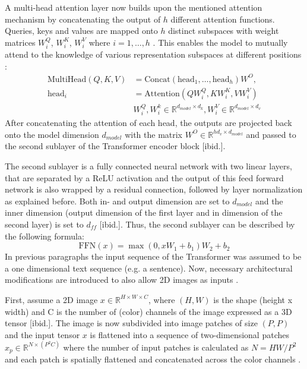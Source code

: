 A multi-head attention layer now builds upon the mentioned attention mechanism by concatenating the output of $h$ different attention functions.
Queries, keys and values are mapped onto $h$ distinct subspaces with weight matrices $W_i^Q$, $W_i^K$, $W_i^V$ where $i=1,\dots,h$ \citep{Vaswani2017}.
This enables the model to mutually attend to the knowledge of various representation subspaces at different positions \citep{Vaswani2017}:
\begin{align}
	\text{MultiHead}(Q,K,V) &= \text{Concat}(\text{head}_1,\dots,\text{head}_h)W^O, \\
	\text{head}_i & = \text{Attention}(QW_i^Q,KW_i^K,VW_i^V) \\
	& W_{i}^{Q}, W_{i}^{k} \in \mathbb{R}^{d_{model}\times d_k} , W_i^V \in \mathbb{R}^{d_{model} \times d_v}	
\end{align}
After concatenating the attention of each head, the outputs are projected back onto the model dimension $d_{model}$ with the matrix $W^O \in \mathbb{R}^{hd_v \times d_{model}}$ and passed to the second sublayer of the Transformer encoder block [ibid.].
\par
The second sublayer is a fully connected neural network with two linear layers, that are separated by a ReLU activation \citep{Vaswani2017} and the output of this feed forward network is also wrapped by a residual connection, followed by layer normalization as explained before.
Both in- and output dimension are set to $d_{model}$ and the inner dimension (output dimension of the first layer and in dimension of the second layer) is set to $d_{ff}$ [ibid.].
Thus, the second sublayer can be described by the following formula:
\begin{equation}
	\text{FFN}(x) = \max(0, xW_1 + b_1)W_2+b_2 
	\label{equation:FFN}
\end{equation}
In previous paragraphs the input sequence of the Transformer was assumed to be a one dimensional text sequence (e.g. a sentence).
Now, necessary architectural modifications are introduced to also allow 2D images as inputs \citep{Dosovitskiy2020}.
\par
First, assume a 2D image $x\in \mathbb{R}^{H\times W \times C }$, where $(H, W)$ is the shape (height x width) and C is the number of (color) channels of the image expressed as a 3D tensor [ibid.].
The image is now subdivided into image patches of size $(P, P)$ and the input tensor $x$ is flattened into a sequence of two-dimensional patches $x_p \in \mathbb{R}^{N \times (P^2C)}$ where the number of input patches is calculated as $N = HW/P^2$ and each patch is spatially flattened and concatenated across the color channels \citep{Dosovitskiy2020}.

